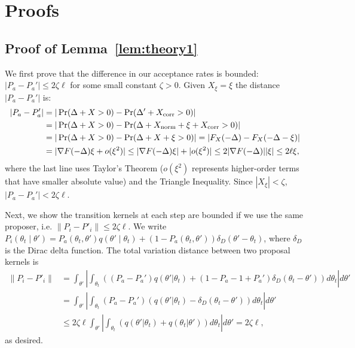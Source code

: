 \documentclass{article}
\begin{document}
\section{Proofs}\label{app:proofs}

\subsection{Proof of Lemma~\ref{lem:theory1}}\label{app:theory1}

We first prove that the difference in our acceptance rates is bounded: $|P_a - P_a'| \leq 2\zeta
\ell$ for some small constant $\zeta > 0$. Given $X_\xi = \xi$ the distance $|P_a - P_a'|$ is:
\begin{align*}
|P_a - P_a'| &= |\Pr(\Delta + X >0) - \Pr(\Delta' + X_{\rm corr} > 0)|\\
& = | \Pr (\Delta + X > 0) - \Pr (\Delta + X_{\rm norm} + \xi + X_{\rm corr} >0) |    \\
&= |\Pr (\Delta + X > 0) -\Pr(\Delta + X + \xi >0)| = |F_X(-\Delta)- F_X(-\Delta - \xi)| \\
&= |\nabla F(-\Delta) \xi + o(\xi^2)| \leq  |\nabla F(-\Delta) \xi| +| o(\xi^2)| \leq 2|\nabla F(-\Delta)| |\xi| \leq 2\ell \xi,
\end{align*}
where the last line uses Taylor's Theorem ($o(\xi^2)$ represents higher-order terms that have
smaller absolute value) and the Triangle Inequality.  Since $|X_\xi| < \zeta$, $|P_a - P_a'| <
2 \zeta \ell$.

Next, we show the transition kernels at each step are bounded if we use the same proposer, i.e.
$\|P_i - P'_i\| \leq 2\zeta \ell$. We write $P_i(\theta_t \mid \theta') = P_a(\theta_t, \theta')
q(\theta'\mid \theta_t) + (1-P_a(\theta_t,\theta')) \delta_D(\theta' - \theta_t)$, where $\delta_D$
is the Dirac delta function. The total variation distance between two proposal kernels is
\begin{align*}
\|P_i - P'_i \| &= \int_{\theta'} \left| \int_{\theta_t}((P_a-P_a') q(\theta'|\theta_t) + (1-P_a - 1+P_a') \delta_D(\theta_t -\theta')) d\theta_t  \right| d\theta' \\
& = \int_{\theta'} \left| \int_{\theta_t} (P_a- P_a')(q(\theta'|\theta_t) - \delta_D(\theta_t - \theta')) d\theta_t \right|  d\theta'\\ 
& \leq 2 \zeta \ell \int_{\theta'} \left| \int_{\theta_t}(q(\theta'|\theta_t) + q(\theta_t|\theta')) d\theta_t \right| d\theta'= 2 \zeta \ell,
\end{align*}
as desired.
\end{document}

